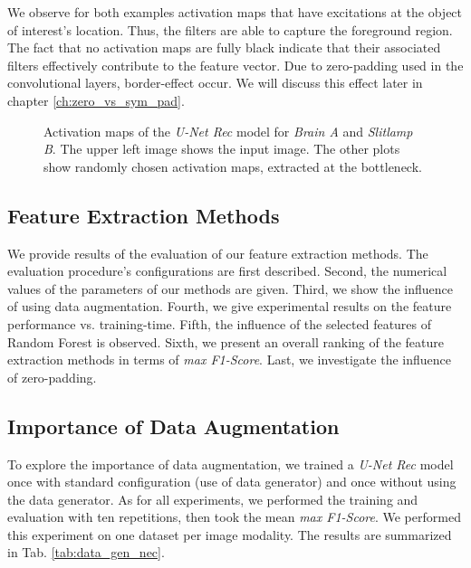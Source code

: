 We observe for both examples activation maps that have excitations at the object of interest's location. Thus, the filters are able to capture the foreground region. The fact that no activation maps are fully black indicate that their associated filters effectively contribute to the feature vector. Due to zero-padding used in the convolutional layers, border-effect occur. We will discuss this effect later in chapter \ref{ch:zero_vs_sym_pad}.
\vspace{30pt}

\begin{figure}[!htbp]
  \centering
  \hfill
  \caption[Activation maps]{Activation maps of the \textit{U-Net Rec} model for \textit{Brain A} and \textit{Slitlamp B}.
    The upper left image shows the input image.
    The other plots show randomly chosen activation maps, extracted at the bottleneck.}
  \label{fig:activatiom_maps}
\end{figure}

\clearpage
\subsection{Feature Extraction Methods}
We provide results of the evaluation of our feature extraction methods.
The evaluation procedure's configurations are first described.
Second, the numerical values of the parameters of our methods are given.
Third, we show the influence of using data augmentation.
Fourth, we give experimental results on the feature performance vs. training-time.
Fifth, the influence of the selected features of Random Forest is observed.
Sixth, we present an overall ranking of the feature extraction methods in terms of \textit{max F1-Score}.
Last, we investigate the influence of zero-padding.


\subsection{Importance of Data Augmentation} \label{ch:nec_data_gen}
To explore the importance of data augmentation, we trained a \textit{U-Net Rec} model once with standard configuration (use of data generator) and once without using the data generator.
As for all experiments, we performed the training and evaluation with ten repetitions, then took the mean \textit{max F1-Score}.
We performed this experiment on one dataset per image modality. The results are summarized in Tab. \ref{tab:data_gen_nec}.
\vspace{30pt}

